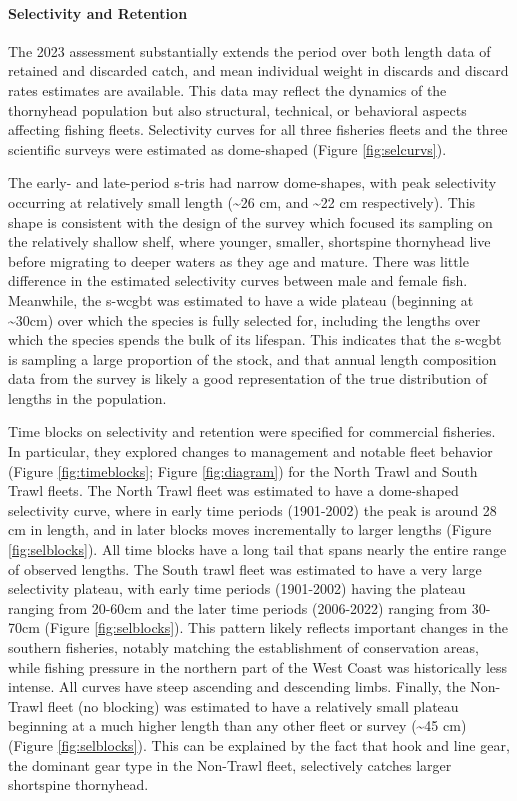 \documentclass[11pt,
  english,
  letterpaper,
]{article}
\begin{document}
\hypertarget{selectivity-and-retention-1}{%
\paragraph{Selectivity and Retention}\label{selectivity-and-retention-1}}

The 2023 assessment substantially extends the period over both length data of retained and discarded catch, and mean individual weight in discards and discard rates estimates are available. This data may reflect the dynamics of the thornyhead population but also structural, technical, or behavioral aspects affecting fishing fleets. Selectivity curves for all three fisheries fleets and the three scientific surveys were estimated as dome-shaped (Figure \ref{fig:selcurvs}).

The early- and late-period \gls{s-tri}s had narrow dome-shapes, with peak selectivity occurring at relatively small length (\textasciitilde26 cm, and \textasciitilde22 cm respectively). This shape is consistent with the design of the survey which focused its sampling on the relatively shallow shelf, where younger, smaller, shortspine thornyhead live before migrating to deeper waters as they age and mature. There was little difference in the estimated selectivity curves between male and female fish. Meanwhile, the \gls{s-wcgbt} was estimated to have a wide plateau (beginning at \textasciitilde30cm) over which the species is fully selected for, including the lengths over which the species spends the bulk of its lifespan. This indicates that the \gls{s-wcgbt} is sampling a large proportion of the stock, and that annual length composition data from the survey is likely a good representation of the true distribution of lengths in the population.

Time blocks on selectivity and retention were specified for commercial fisheries. In particular, they explored changes to management and notable fleet behavior (Figure \ref{fig:timeblocks}; Figure \ref{fig:diagram}) for the North Trawl and South Trawl fleets. The North Trawl fleet was estimated to have a dome-shaped selectivity curve, where in early time periods (1901-2002) the peak is around 28 cm in length, and in later blocks moves incrementally to larger lengths (Figure \ref{fig:selblocks}). All time blocks have a long tail that spans nearly the entire range of observed lengths. The South trawl fleet was estimated to have a very large selectivity plateau, with early time periods (1901-2002) having the plateau ranging from 20-60cm and the later time periods (2006-2022) ranging from 30-70cm (Figure \ref{fig:selblocks}). This pattern likely reflects important changes in the southern fisheries, notably matching the establishment of conservation areas, while fishing pressure in the northern part of the West Coast was historically less intense. All curves have steep ascending and descending limbs. Finally, the Non-Trawl fleet (no blocking) was estimated to have a relatively small plateau beginning at a much higher length than any other fleet or survey (\textasciitilde45 cm) (Figure \ref{fig:selblocks}). This can be explained by the fact that hook and line gear, the dominant gear type in the Non-Trawl fleet, selectively catches larger shortspine thornyhead.
\end{document}
